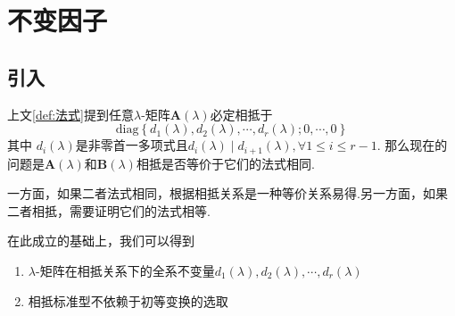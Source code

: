 \newpage
\section{不变因子}
\subsection{引入}
上文\cref{def:法式}提到任意$\lambda$-矩阵$\bm{A}\left(\lambda\right)$必定相抵于
\[
    \mathrm{diag}\left\{
    d_1\left(\lambda\right),d_2\left(\lambda\right),\cdots,d_r\left(\lambda\right);0,\cdots,0
    \right\}
\]其中
$d_i\left(\lambda\right)$是非零首一多项式且$d_i\left(\lambda\right)\mid d_{i+1}\left(\lambda\right),\forall 1\leqslant i\leqslant r-1.$
那么现在的问题是$\bm{A}\left(\lambda\right)$和$\bm{B}\left(\lambda\right)$相抵是否等价于它们的法式相同.

一方面，如果二者法式相同，根据相抵关系是一种等价关系易得.另一方面，如果二者相抵，需要证明它们的法式相等.

在此成立的基础上，我们可以得到\begin{enumerate}[label=\arabic*）]
    \item $\lambda$-矩阵在相抵关系下的全系不变量$d_1\left(\lambda\right),d_2\left(\lambda\right),\cdots,d_r\left(\lambda\right)$
    \item 相抵标准型不依赖于初等变换的选取
\end{enumerate}
